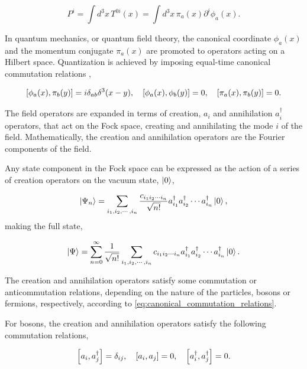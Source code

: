 \documentclass[11pt,a4paper,twoside,pdf]{article}
\numberwithin{equation}{section}
\begin{document}
\begin{equation}
    P^i = \int d^3x \, T^{0i}(x) = \int d^3x \, \pi_a (x) \partial^i \phi_a (x).
\end{equation}

In quantum mechanics, or quantum field theory, the canonical coordinate 
\( \phi_a(x) \) and the momentum conjugate \( \pi_a(x) \) are promoted to operators 
acting on a Hilbert space. Quantization is achieved by imposing equal-time canonical 
commutation relations \cite{Bjorken:100769},

\begin{equation}
    \left[ \phi_a (x), \pi_b (y) \right] = i \delta_{ab} \delta^3(x-y),
    \quad \left[ \phi_a (x), \phi_b (y) \right] = 0, \quad
    \left[ \pi_a (x), \pi_b (y) \right] = 0.
    \label{eq:canonical_commutation_relations}
\end{equation}

The field operators are expanded in terms of creation, $a_i$ and annihilation 
$a^\dagger_i$ operators, that act on the Fock space, creating and annihilating the mode 
$i$ of the field. Mathematically, the creation and annihilation operators are the 
Fourier components of the field.

Any state component in the Fock space can be expressed as the action of a series of 
creation operators on the vacuum state, $\ket{0}$,

\begin{equation}
    \ket{\Psi_n} = \sum_{i_1,i_2,\cdots,i_n} \frac{c_{i_1 i_2 \cdots i_n}}{\sqrt{n!}}
    a^\dagger_{i_1} a^\dagger_{i_2} \cdots a^\dagger_{i_n} \ket{0},
\end{equation}
making the full state, 

\begin{equation}
    \ket{\Psi} = \sum_{n=0}^{\infty} \frac{1}{\sqrt{n!}} \sum_{i_1,i_2,\cdots,i_n} 
    c_{i_1 i_2 \cdots i_n} a^\dagger_{i_1} a^\dagger_{i_2} \cdots a^\dagger_{i_n} \ket{0}.
\end{equation}

The creation and annihilation operators satisfy some commutation or anticommutation 
relations, depending on the nature of the particles, bosons or fermions, respectively,
according to \eqref{eq:canonical_commutation_relations}.

For bosons, the creation and annihilation operators satisfy the following commutation 
relations,

\begin{equation}
    \left[ a_i, a_j^\dagger \right] = \delta_{ij}, \quad
    \left[ a_i, a_j \right] = 0, \quad
    \left[ a_i^\dagger, a_j^\dagger \right] = 0.
\end{equation}
\end{document}
